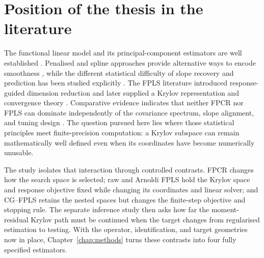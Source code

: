 \section{Position of the thesis in the literature}
\label{sec:literature-positioning}

The functional linear model and its principal-component estimators are well established \parencite{cardot_ferraty_sarda_1999,hall_horowitz_2007}. Penalised and spline approaches provide alternative ways to encode smoothness \parencite{crambes_kneip_sarda_2009}, while the different statistical difficulty of slope recovery and prediction has been studied explicitly \parencite{cai_hall_2006}. The FPLS literature introduced response-guided dimension reduction and later supplied a Krylov representation and convergence theory \parencite{preda_saporta_2005,delaigle_hall_2012}. Comparative evidence indicates that neither FPCR nor FPLS can dominate independently of the covariance spectrum, slope alignment, and tuning design \parencite{febrero_bande_et_al_2017}. The question pursued here lies where those statistical principles meet finite-precision computation: a Krylov subspace can remain mathematically well defined even when its coordinates have become numerically unusable.

The study isolates that interaction through controlled contrasts. FPCR changes how the search space is selected; raw and Arnoldi FPLS hold the Krylov space and response objective fixed while changing its coordinates and linear solver; and CG--FPLS retains the nested spaces but changes the finite-step objective and stopping rule. The separate inference study then asks how far the moment-residual Krylov path must be continued when the target changes from regularised estimation to testing. With the operator, identification, and target geometries now in place, Chapter~\ref{chap:methods} turns these contrasts into four fully specified estimators.
